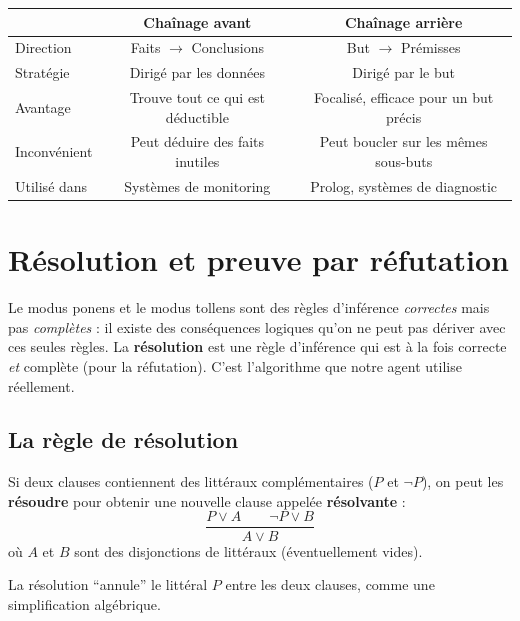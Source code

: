 \documentclass[11pt,a4paper]{article}
\begin{document}
\begin{center}
\begin{tabular}{lcc}
\toprule
& \textbf{Chaînage avant} & \textbf{Chaînage arrière} \\
\midrule
Direction & Faits $\to$ Conclusions & But $\to$ Prémisses \\
Stratégie & Dirigé par les données & Dirigé par le but \\
Avantage & Trouve tout ce qui est déductible & Focalisé, efficace pour un but précis \\
Inconvénient & Peut déduire des faits inutiles & Peut boucler sur les mêmes sous-buts \\
Utilisé dans & Systèmes de monitoring & Prolog, systèmes de diagnostic \\
\bottomrule
\end{tabular}
\end{center}

\section{Résolution et preuve par réfutation}

Le modus ponens et le modus tollens sont des règles d'inférence \textit{correctes} mais pas \textit{complètes} : il existe des conséquences logiques qu'on ne peut pas dériver avec ces seules règles. La \textbf{résolution} est une règle d'inférence qui est à la fois correcte \textit{et} complète (pour la réfutation). C'est l'algorithme que notre agent utilise réellement.

\subsection{La règle de résolution}

\begin{theorembox}
Si deux clauses contiennent des littéraux complémentaires ($P$ et $\neg P$), on peut les \textbf{résoudre} pour obtenir une nouvelle clause appelée \textbf{résolvante} :
$$\frac{P \lor A \quad\quad \neg P \lor B}{A \lor B}$$
où $A$ et $B$ sont des disjonctions de littéraux (éventuellement vides).
\end{theorembox}

La résolution ``annule'' le littéral $P$ entre les deux clauses, comme une simplification algébrique.
\end{document}
